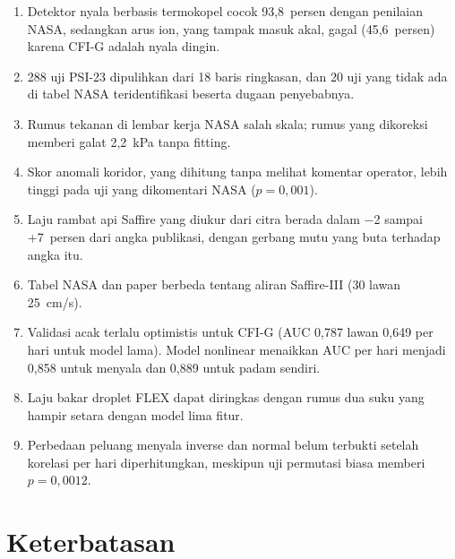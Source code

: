 \documentclass[11pt,a4paper]{report}
\begin{document}
\begin{enumerate}
\item Detektor nyala berbasis termokopel cocok 93,8~persen dengan penilaian NASA, sedangkan arus
      ion, yang tampak masuk akal, gagal (45,6~persen) karena CFI-G adalah nyala dingin.
\item 288 uji PSI-23 dipulihkan dari 18 baris ringkasan, dan 20 uji yang tidak ada di tabel NASA
      teridentifikasi beserta dugaan penyebabnya.
\item Rumus tekanan di lembar kerja NASA salah skala; rumus yang dikoreksi memberi galat 2,2~kPa
      tanpa fitting.
\item Skor anomali koridor, yang dihitung tanpa melihat komentar operator, lebih tinggi pada uji
      yang dikomentari NASA ($p = 0{,}001$).
\item Laju rambat api Saffire yang diukur dari citra berada dalam $-$2 sampai +7~persen dari angka
      publikasi, dengan gerbang mutu yang buta terhadap angka itu.
\item Tabel NASA dan paper berbeda tentang aliran Saffire-III (30 lawan 25~cm/s).
\item Validasi acak terlalu optimistis untuk CFI-G (AUC 0,787 lawan 0,649 per hari untuk model
      lama). Model nonlinear menaikkan AUC per hari menjadi 0,858 untuk menyala dan 0,889 untuk
      padam sendiri.
\item Laju bakar droplet FLEX dapat diringkas dengan rumus dua suku yang hampir setara dengan model
      lima fitur.
\item Perbedaan peluang menyala inverse dan normal belum terbukti setelah korelasi per hari
      diperhitungkan, meskipun uji permutasi biasa memberi $p = 0{,}0012$.
\end{enumerate}

\section{Keterbatasan}
\end{document}
